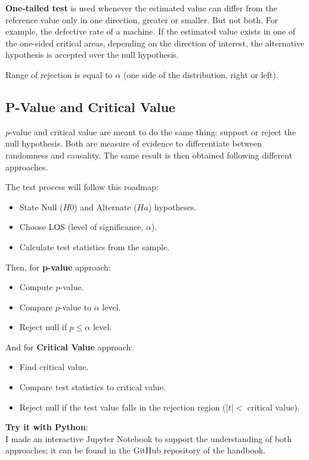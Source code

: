 \documentclass{article}
\begin{document}
\textbf{One-tailed test} is used whenever the estimated value can differ from the reference value only in one direction, greater or smaller. But not both. 
For example, the defective rate of a machine. 
If the estimated value exists in one of the one-sided critical areas, depending on the direction of interest, the alternative hypothesis is accepted over the null hypothesis. 

Range of rejection is equal to $\alpha$ (one side of the distribution, right or left).

\subsection{P-Value and Critical Value}
$p$-value and critical value are meant to do the same thing: support or reject the null hypothesis. Both are measure of evidence to differentiate between randomness and causality. 
The same result is then obtained following different approaches. 

The test process will follow this roadmap:
\begin{itemize}
    \item State Null ($H0$) and Alternate ($Ha$) hypotheses.
    \item Choose LOS (level of significance, $\alpha$).
    \item Calculate test statistics from the sample.
\end{itemize}

Then, for \textbf{p-value} approach:
\begin{itemize}
    \item Compute $p$-value.
    \item Compare $p$-value to $\alpha$ level.
    \item Reject null if $p \leq \alpha$ level.
\end{itemize}

And for \textbf{Critical Value} approach:
\begin{itemize}
    \item Find critical value.
    \item Compare test statistics to critical value.
    \item Reject null if the test value falls in the rejection region ($|t| <$ critical value).
\end{itemize}

\textbf{Try it with Python}: \\ 
I made an interactive Jupyter Notebook to support the understanding of both approaches; it can be found in the GitHub repository of the handbook.
\end{document}
